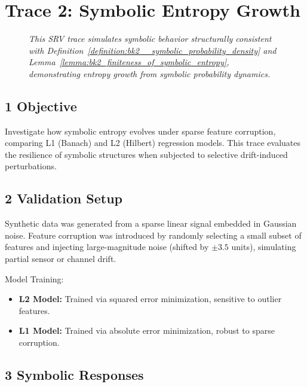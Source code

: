 \section*{Trace 2: Symbolic Entropy Growth}
\label{section:trace2_symbolic_entropy_growth}

\begin{figure}[htbp]
\centering
\caption[\textit{SRV trace (summary)}]{\textit{This SRV trace simulates symbolic behavior structurally consistent with Definition~\ref{definition:bk2__symbolic_probability_density} and Lemma~\ref{lemma:bk2_finiteness_of_symbolic_entropy}, demonstrating entropy growth from symbolic probability dynamics.}}
\label{figure:trace2_entropy_growth_summary}
\end{figure}

\subsection*{1 Objective}
\label{subsection:trace2_objective}

Investigate how symbolic entropy evolves under sparse feature corruption, comparing L1 (Banach) and L2 (Hilbert) regression models. This trace evaluates the resilience of symbolic structures when subjected to selective drift-induced perturbations.

\subsection*{2 Validation Setup}
\label{subsection:trace2_validation_setup}

Synthetic data was generated from a sparse linear signal embedded in Gaussian noise. Feature corruption was introduced by randomly selecting a small subset of features and injecting large-magnitude noise (shifted by $\pm 3.5$ units), simulating partial sensor or channel drift.

Model Training:
\begin{itemize}
    \item \textbf{L2 Model:} Trained via squared error minimization, sensitive to outlier features.
    \item \textbf{L1 Model:} Trained via absolute error minimization, robust to sparse corruption.
\end{itemize}

\subsection*{3 Symbolic Responses}
\label{subsection:trace2_symbolic_responses}

